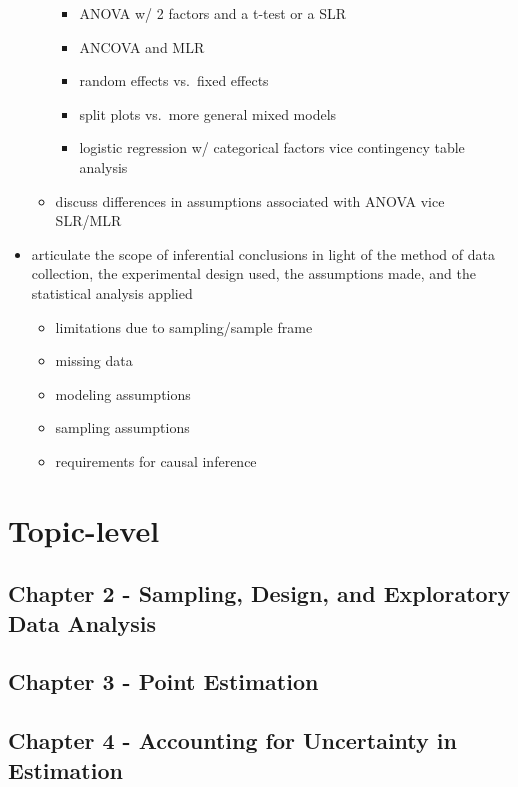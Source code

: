 \documentclass[]{book}
\providecommand{\tightlist}{%
  \setlength{\itemsep}{0pt}\setlength{\parskip}{0pt}}
\begin{document}
\begin{itemize}
\begin{itemize}
    \begin{itemize}
    \tightlist
    \item
      ANOVA w/ 2 factors and a t-test or a SLR
    \item
      ANCOVA and MLR
    \item
      random effects vs.~fixed effects
    \item
      split plots vs.~more general mixed models
    \item
      logistic regression w/ categorical factors vice contingency table
      analysis
    \end{itemize}
  \item
    discuss differences in assumptions associated with ANOVA vice
    SLR/MLR
  \end{itemize}
\item
  articulate the scope of inferential conclusions in light of the method
  of data collection, the experimental design used, the assumptions
  made, and the statistical analysis applied

  \begin{itemize}
  \tightlist
  \item
    limitations due to sampling/sample frame
  \item
    missing data
  \item
    modeling assumptions
  \item
    sampling assumptions
  \item
    requirements for causal inference
  \end{itemize}
\end{itemize}

\section{Topic-level}\label{topic-level}

\subsection{Chapter 2 - Sampling, Design, and Exploratory Data
Analysis}\label{chapter-2---sampling-design-and-exploratory-data-analysis}

\subsection{Chapter 3 - Point
Estimation}\label{chapter-3---point-estimation}

\subsection{Chapter 4 - Accounting for Uncertainty in
Estimation}\label{chapter-4---accounting-for-uncertainty-in-estimation}
\end{document}
